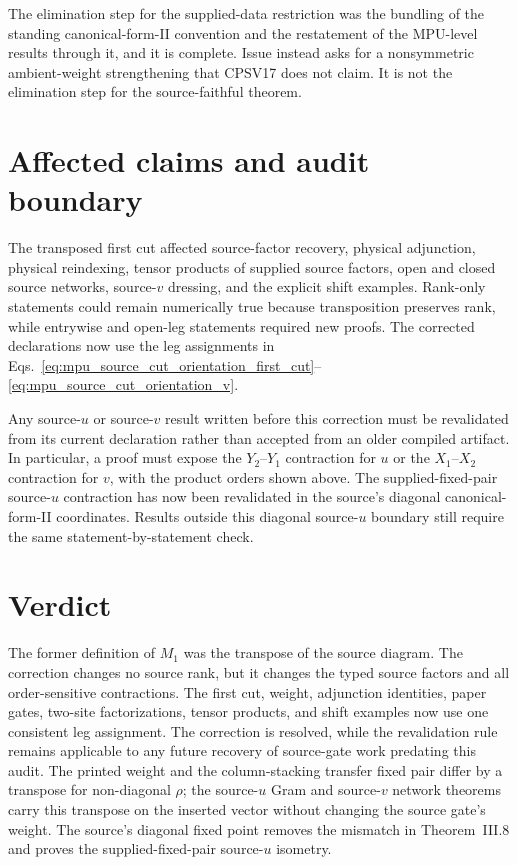\documentclass{article}
\begin{document}
The elimination step for the supplied-data restriction was the bundling of the
standing canonical-form-II convention and the restatement of the MPU-level
results through it, and it is complete. Issue  instead
asks for a nonsymmetric ambient-weight strengthening that CPSV17 does not
claim. It is not the elimination step for the source-faithful theorem.

\section{Affected claims and audit boundary}

The transposed first cut affected source-factor recovery, physical adjunction,
physical reindexing, tensor products of supplied source factors, open and
closed source networks, source-$v$ dressing, and the explicit shift examples.
Rank-only statements could remain numerically true because transposition
preserves rank, while entrywise and open-leg statements required new proofs.
The corrected declarations now use the leg assignments in
Eqs.~\ref{eq:mpu_source_cut_orientation_first_cut}--
\ref{eq:mpu_source_cut_orientation_v}.

Any source-$u$ or source-$v$ result written before this correction must be
revalidated from its current declaration rather than accepted from an older
compiled artifact. In particular, a proof must expose the $Y_2$--$Y_1$
contraction for $u$ or the $X_1$--$X_2$ contraction for $v$, with the product
orders shown above. The supplied-fixed-pair source-$u$ contraction has now been
revalidated in the source's diagonal canonical-form-II coordinates. Results
outside this diagonal source-$u$ boundary still require the same
statement-by-statement check.

\section{Verdict}

The former definition of $M_1$ was the transpose of the source diagram. The
correction changes no source rank, but it changes the typed source factors and
all order-sensitive contractions. The first cut, weight, adjunction identities,
paper gates, two-site factorizations, tensor products, and shift examples now
use one consistent leg assignment. The correction is resolved, while the
revalidation rule remains applicable to any future recovery of source-gate
work predating this audit. The printed weight and the column-stacking transfer
fixed pair differ by a transpose for non-diagonal $\rho$; the source-$u$ Gram
and source-$v$ network theorems carry this transpose on the inserted vector
without changing the source gate's weight. The source's diagonal fixed point
removes the mismatch in Theorem~III.8 and proves the supplied-fixed-pair
source-$u$ isometry.



\end{document}
